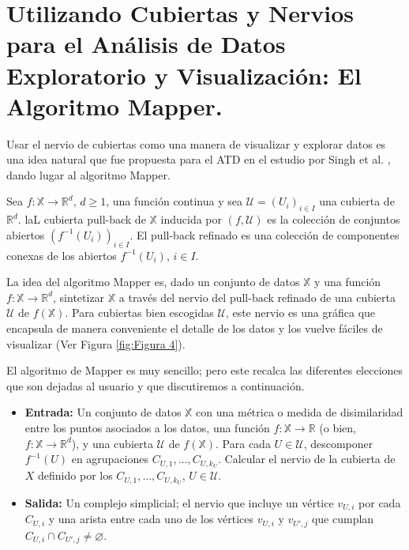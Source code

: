 \chapter{Utilizando Cubiertas y Nervios para el An\'alisis de Datos Exploratorio y Visualizaci\'on: El
Algoritmo Mapper.}

Usar el nervio de cubiertas como una manera de visualizar y explorar datos es una idea natural que fue
propuesta para el ATD en el estudio por Singh et al. \cite{Singh2007}, dando lugar al algoritmo Mapper.

\begin{definicion}
    Sea $f:\mathbb{X}\rightarrow\mathbb{R}^{d}$, $d\geq1$, una funci\'on continua y sea
    $\mathcal{U} = \left(U_{i}\right)_{i\in I}$ una cubierta de $\mathbb{R}^{d}$. laL cubierta pull-back
    de $\mathbb{X}$ inducida por $\left(f, \mathcal{U}\right)$ es la colecci\'on de conjuntos abiertos
    $\left(f^{-1}\left(U_{i}\right)\right)_{i\in I}$. El pull-back refinado es una colecci\'on de
    componentes conexas de los abiertos $f^{-1}\left(U_{i}\right)$, $i\in I$.
\end{definicion}

La idea del algoritmo Mapper es, dado un conjunto de datos $\mathbb{X}$ y una funci\'on
$f:\mathbb{X}\rightarrow\mathbb{R}^{d}$, sintetizar $\mathbb{X}$ a trav\'es del nervio
del pull-back refinado de una cubierta $\mathcal{U}$ de $f\left(\mathbb{X}\right)$. Para cubiertas bien
escogidas $\mathcal{U}$, este nervio es una gr\'afica que encapsula de manera conveniente el detalle de los
datos y los vuelve f\'aciles de visualizar (Ver Figura \ref{fig:Figura 4}).

El algoritmo de Mapper es muy sencillo; pero este recalca las diferentes elecciones que son dejadas al
usuario y que discutiremos a continuaci\'on.

\begin{itemize}
    \item \textbf{Entrada:} Un conjunto de datos $\mathbb{X}$ con una m\'etrica o medida de disimilaridad
    entre los puntos asociados a los datos, una funci\'on $f:\mathbb{X}\rightarrow\mathbb{R}$
    (o bien, $f:\mathbb{X}\rightarrow\mathbb{R}^{d}$), y una cubierta $\mathcal{U}$
    de $f\left(\mathbb{X}\right)$.
    Para cada $U\in\mathcal{U}$, descomponer $f^{-1}\left(U\right)$ en agrupaciones
    $C_{U,1}, \dots, C_{U,k_{U}}$. Calcular el nervio de la cubierta de $X$ definido por los
    $C_{U,1}, \dots, C_{U,k_{U}}$, $U\in\mathcal{U}$.
    
    \item \textbf{Salida:} Un complejo simplicial; el nervio que incluye un v\'ertice $v_{U,i}$ por cada
    $C_{U,i}$ y una arista entre cada uno de los v\'ertices $v_{U,i}$ y $v_{U',j}$ que cumplan
    $C_{U,i}\cap C_{U',j} \neq \varnothing$.
    
\end{itemize}

